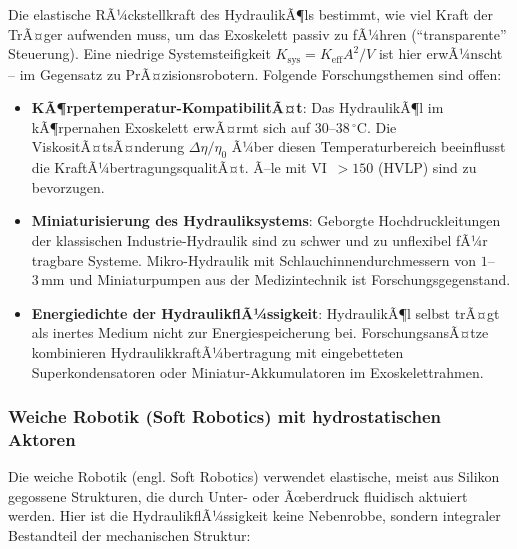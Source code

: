 ﻿\documentclass[a4paper,12pt]{scrreprt}
\theoremstyle{definition}
\begin{document}
Die elastische RÃ¼ckstellkraft des HydraulikÃ¶ls bestimmt, wie viel
Kraft der TrÃ¤ger aufwenden muss, um das Exoskelett passiv zu fÃ¼hren
(``transparente'' Steuerung). Eine niedrige Systemsteifigkeit
$K_{\mathrm{sys}} = K_{\mathrm{eff}} A^2 / V$ ist hier erwÃ¼nscht --
im Gegensatz zu PrÃ¤zisionsrobotern. Folgende Forschungsthemen sind
offen:
\begin{itemize}
  \item \textbf{KÃ¶rpertemperatur-KompatibilitÃ¤t}: Das HydraulikÃ¶l im
    kÃ¶rpernahen Exoskelett erwÃ¤rmt sich auf $30$--$38\,{^\circ}\mathrm{C}$.
    Die ViskositÃ¤tsÃ¤nderung $\Delta\eta / \eta_0$ Ã¼ber diesen
    Temperaturbereich beeinflusst die KraftÃ¼bertragungsqualitÃ¤t.
    Ã–le mit VI~$> 150$ (HVLP) sind zu bevorzugen.
  \item \textbf{Miniaturisierung des Hydrauliksystems}: Geborgte
    Hochdruckleitungen der klassischen Industrie-Hydraulik sind
    zu schwer und zu unflexibel fÃ¼r tragbare Systeme. Mikro-Hydraulik
    mit Schlauchinnendurchmessern von $1$--$3\,\mathrm{mm}$ und
    Miniaturpumpen aus der Medizintechnik ist Forschungsgegenstand.
  \item \textbf{Energiedichte der HydraulikflÃ¼ssigkeit}: HydraulikÃ¶l selbst
    trÃ¤gt als inertes Medium nicht zur Energiespeicherung bei.
    ForschungsansÃ¤tze kombinieren HydraulikkraftÃ¼bertragung
    mit eingebetteten Superkondensatoren oder Miniatur-Akkumulatoren
    im Exoskelettrahmen.
\end{itemize}

\subsubsection{Weiche Robotik (Soft Robotics) mit hydrostatischen Aktoren}

Die weiche Robotik (engl. Soft Robotics) verwendet elastische, meist
aus Silikon gegossene Strukturen, die durch Unter- oder Ãœberdruck
fluidisch aktuiert werden. Hier ist die HydraulikflÃ¼ssigkeit keine
Neben\-robbe, sondern integraler Bestandteil der mechanischen Struktur:
\end{document}
